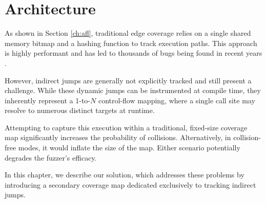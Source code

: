 \chapter{Architecture}
\label{ch:arch}

As shown in Section \ref{ch:afl}, traditional edge coverage relies on a single shared memory bitmap and a hashing function to track execution paths. This approach is highly performant and has led to thousands of bugs being found in recent years \cite{ossfuzz}. 

However, indirect jumps are generally not explicitly tracked and still present a challenge. While these dynamic jumps can be instrumented at compile time, they inherently represent a 1-to-$N$ control-flow mapping, where a single call site may resolve to numerous distinct targets at runtime. 

Attempting to capture this execution within a traditional, fixed-size coverage map significantly increases the probability of collisions. Alternatively, in collision-free modes, it would inflate the size of the map. Either scenario potentially degrades the fuzzer's efficacy. 

In this chapter, we describe our solution, which addresses these problems by introducing a secondary coverage map dedicated exclusively to tracking indirect jumps.









